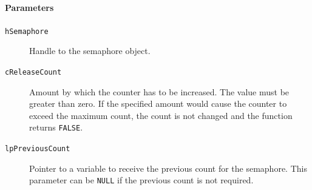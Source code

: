 \paragraph{Parameters}
\begin{description}
\item [\texttt{hSemaphore}] Handle to the semaphore object.
\item [\texttt{cReleaseCount}] Amount by which the counter has to be increased. The value must be greater than zero. If the specified amount would cause the counter to exceed the maximum count, the count is not changed and the function returns \texttt{FALSE}.
\item [\texttt{lpPreviousCount}] Pointer to a variable to receive the previous count for the semaphore. This parameter can be \texttt{NULL} if the previous count is not required.
\end{description}
